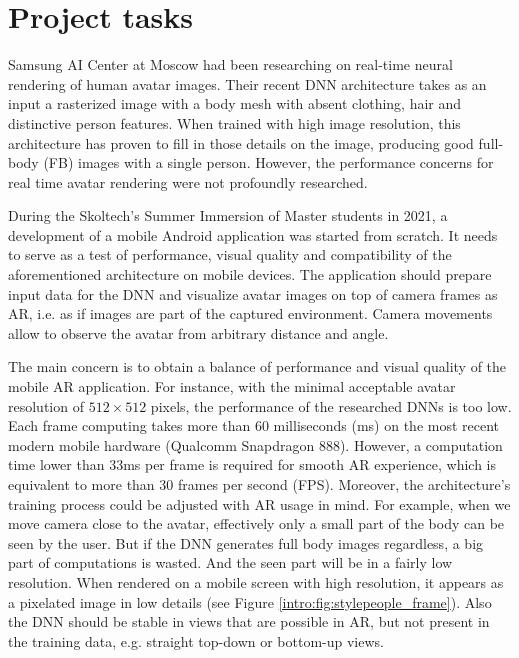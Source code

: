\section{Project tasks}\label{intro:task}
 
Samsung AI Center at Moscow had been researching on real-time neural rendering of human avatar images. Their recent DNN architecture \cite{dnn:stylepeople21} takes as an input a rasterized image with a body mesh with absent clothing, hair and distinctive person features. When trained with high image resolution, this architecture has proven to fill in those details on the image, producing good full-body (FB) images with a single person. However, the performance concerns for real time avatar rendering were not profoundly researched.
 

During the Skoltech's Summer Immersion of Master students in 2021, a development of a mobile Android application was started from scratch. It needs to serve as a test of performance, visual quality and compatibility of the aforementioned architecture on mobile devices. The application should prepare input data for the DNN and visualize avatar images on top of camera frames as AR, i.e. as if images are part of the captured environment. Camera movements allow to observe the avatar from arbitrary distance and angle.
 
The main concern is to obtain a balance of performance and visual quality of the mobile AR application. For instance, with the minimal acceptable avatar resolution of $512\times512$ pixels, the performance of the researched DNNs is too low. Each frame computing takes more than 60 milliseconds (ms) on the most recent modern mobile hardware (Qualcomm Snapdragon 888). However, a computation time lower than 33ms per frame is required for smooth AR experience, which is equivalent to more than 30 frames per second (FPS). Moreover, the architecture's training process could be adjusted with AR usage in mind. For example, when we move camera close to the avatar, effectively only a small part of the body can be seen by the user. But if the DNN generates full body images regardless, a big part of computations is wasted. And the seen part will be in a fairly low resolution. When rendered on a mobile screen with high resolution, it appears as a pixelated image in low details (see Figure \ref{intro:fig:stylepeople_frame}\protect{}). Also the DNN should be stable in views that are possible in AR, but not present in the training data, e.g. straight top-down or bottom-up views. 


